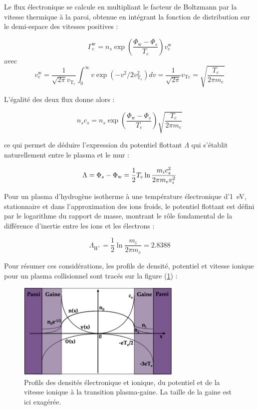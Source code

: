\begin{refsection}
Le flux électronique se calcule en multipliant le facteur de
Boltzmann par la vitesse thermique à la paroi, obtenue en intégrant la fonction
de distribution sur le demi-espace des vitesses positives :

\begin{equation}
\Gamma_e^\text{w}=n_s\exp\left(\frac{\Phi_\text{w}-\Phi_s}{T_e}\right)v_{e}^\text{w}
\end{equation}
avec 
\begin{equation}
	v_{e}^\text{w}=\frac{1}{\sqrt{2\pi}v_{\text{T}_e}}\int_0^\infty
	v\exp\left(-v^2/2v_{\text{T}_e}^2\right)dv=\frac{1}{\sqrt{2\pi}}v_{\text{T}e}=
	\sqrt{\frac{T_{e}}{2\pi m_{e}}}
\end{equation}

L'égalité des deux flux donne alors :

\begin{equation}
n_sc_s=n_s\exp\left(\frac{\Phi_\text{w}-\Phi_s}{T_e}\right)\sqrt{\frac{T_{e}}{2\pi
m_{e}}}
\end{equation}

ce qui permet de déduire l'expression du potentiel flottant $\Lambda$ qui
s'établit naturellement entre le plasma et le mur :

\begin{equation}
	\Lambda=\Phi_{s}-\Phi_\text{w}=\frac{1}{2}T_{e}\ln{\frac{m_{i}c_{s}^2}{2\pi
	m_{e}v_{i}^{{2}}}}
	\end{equation}

Pour un plasma d'hydrogène isotherme à une température électronique
d'1~eV, stationnaire et dans l'approximation des ions froids, le potentiel
flottant est défini par le logarithme du rapport de masse, montrant le rôle
fondamental de la différence d'inertie entre les ions et les électrons :

\begin{equation}
	\Lambda_{\text{H}^+}=\frac{1}{2}\ln{\frac{m_{i}}{2\pi
	m_{e}}}=2.8388
	\end{equation}

Pour résumer ces considérations, les profils de densité,
potentiel et vitesse ionique pour un plasma collisionnel sont tracés sur la
figure (\ref{1-profilesgaine}) :
	
\begin{figure}[htbp]
\centering
\includegraphics[width=0.7\textwidth]{figures/1-sheathprofiles.png}{\caption{Profils
des densités électronique et ionique,
du potentiel et de la vitesse ionique à
la transition plasma-gaine\parencite{Rax}. La taille
de la gaine est ici exagérée.}\label{1-profilesgaine}}
\end{figure}


\end{refsection}
